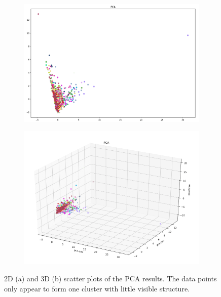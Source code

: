\begin{figure}[H]
  \centering
  \begin{subfigure}{.475\textwidth}
    \centering
    \includegraphics[width=1\textwidth]{./images/pca2d.png}
  \end{subfigure}%
  \hfill
  \begin{subfigure}{.475\textwidth}
    \centering
    \includegraphics[width=1\textwidth]{./images/pca3d.png}
  \end{subfigure}
	\caption{2D (a) and 3D (b) scatter plots of the PCA results. The data points only appear to form one cluster with little visible structure.}
  \label{figure:PCA}
\end{figure}



